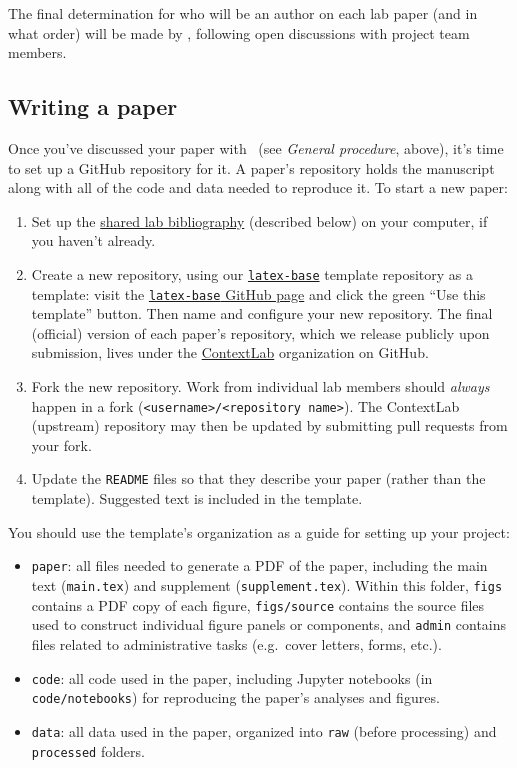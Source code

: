 \documentclass{tufte-book} %
\begin{document}
The final determination for who will be an author on each lab paper
(and in what order) will be made by \director, following open
discussions with project team members.

\subsection{Writing a paper}
  Once you've discussed your paper with \director~(see
\textit{General procedure}, above), it's time to set up a GitHub
repository for it.  A paper's repository holds the manuscript along
with all of the code and data needed to reproduce it.  To start a new
paper:
\begin{enumerate}
\item Set up the \hyperref[sec:bibliography]{shared lab bibliography}
  (described below) on your computer, if you haven't already.
\item Create a new repository, using our
  \href{https://github.com/ContextLab/latex-base}{\texttt{latex-base}}
  template repository as a template: visit the
  \href{https://github.com/ContextLab/latex-base}{\texttt{latex-base}
    GitHub page} and click the green ``Use this template'' button.
  Then name and configure your new repository.  The final (official)
  version of each paper's repository, which we release publicly upon
  submission, lives under the
  \href{https://github.com/ContextLab}{ContextLab} organization on
  GitHub.
\item Fork the new repository.  Work from individual lab members
  should \textit{always} happen in a fork
  (\texttt{<username>/<repository name>}).  The ContextLab (upstream)
  repository may then be updated by submitting pull requests from your
  fork.
\item Update the \texttt{README} files so that they describe your
  paper (rather than the template).  Suggested text is included in the
  template.
\end{enumerate}

You should use the template's organization as a guide for setting up
your project:
\begin{itemize}
\item \texttt{paper}: all files needed to generate a PDF of the
  paper, including the main text (\texttt{main.tex}) and supplement
  (\texttt{supplement.tex}).  Within this folder, \texttt{figs}
  contains a PDF copy of each figure, \texttt{figs/source} contains
  the source files used to construct individual figure panels or
  components, and \texttt{admin} contains files related to
  administrative tasks (e.g.\ cover letters, forms, etc.).
\item \texttt{code}: all code used in the paper, including Jupyter
  notebooks (in \texttt{code/notebooks}) for reproducing the paper's
  analyses and figures.
\item \texttt{data}: all data used in the paper, organized into
  \texttt{raw} (before processing) and \texttt{processed} folders.
\end{itemize}
\end{document}
